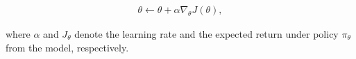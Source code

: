 \begin{equation}
  \begin{array}{l}
    \theta \longleftarrow \theta + \alpha \nabla_{\theta} J(\theta),
  \end{array}
\end{equation}

where $\alpha$ and $J_{\theta}$ denote the learning rate and the expected return under policy $\pi_{\theta}$ from the model, respectively.


